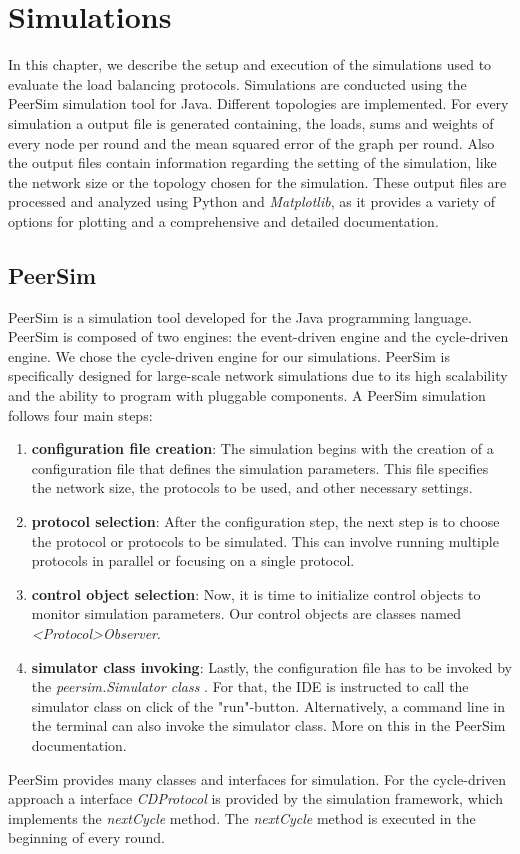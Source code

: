 \chapter{Simulations}\label{chap:simulations}
In this chapter, we describe the setup and execution of the simulations used to evaluate the load balancing protocols. Simulations are conducted using the PeerSim simulation tool for Java. Different topologies are implemented. For every simulation a output file is generated containing, the loads, sums and weights of every node per round and the mean squared error of the graph per round. Also the output files contain information regarding the setting of the simulation, like the network size or the topology chosen for the simulation. These output files are processed and analyzed using Python and \textit{Matplotlib}, as it provides a variety of options for plotting and a comprehensive and detailed documentation.

\section{PeerSim}
PeerSim is a simulation tool developed for the Java programming language. PeerSim is composed of two engines: the event-driven engine and the cycle-driven engine. We chose the cycle-driven engine for our simulations. PeerSim is specifically designed for large-scale network simulations due to its high scalability and the ability to program with pluggable components. A PeerSim simulation follows four main steps:
\begin{enumerate}
    \item \textbf{configuration file creation}: The simulation begins with the creation of a configuration file that defines the simulation parameters. This file specifies the network size, the protocols to be used, and other necessary settings.
    \item \textbf{protocol selection}: After the configuration step, the next step is to choose the protocol or protocols to be simulated. This can involve running multiple protocols in parallel or focusing on a single protocol.
    \item \textbf{control object selection}: Now, it is time to initialize control objects to monitor simulation parameters. Our control objects are classes named \textit{<Protocol>Observer}.
    \item \textbf{simulator class invoking}: Lastly, the configuration file has to be invoked by the \textit{peersim.Simulator class} \cite{peersimdocs}. For that, the IDE is instructed to call the simulator class on click of the "run"-button. Alternatively, a command line in the terminal can also invoke the simulator class. More on this in the PeerSim documentation.
\end{enumerate}
PeerSim provides many classes and interfaces for simulation. For the cycle-driven approach a interface \textit{CDProtocol} is provided by the simulation framework, which implements the \textit{nextCycle} method. The \textit{nextCycle} method is executed in the beginning of every round.

